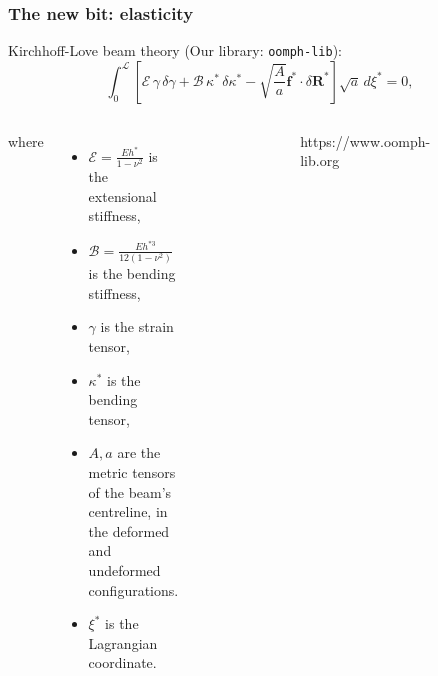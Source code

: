 \documentclass{beamer}
\newcommand{\bi}{\begin{itemize}}
\newcommand{\ei}{\end{itemize}}
\begin{document}
\begin{frame}
	\frametitle{The new bit: elasticity}
	\begin{overlayarea}{\textwidth}{\textheight}
		\vspace{-0.5cm}
       \small Kirchhoff-Love beam theory (Our library: \texttt{oomph-lib}):
		\vspace{-0.1cm} 
		\begin{equation*}
			\int^{\mathcal{L}}_0 \left[\mathscr{E}\,\gamma\, \delta\gamma+\mathscr{B}\,\kappa^*\,\delta\kappa^*-\sqrt{\frac{A}{a}}\bm{f}^*\cdot \delta\bm{R}^*\right]\sqrt{a}\,d\xi^*=0,
		\end{equation*}
		\begin{columns}
	where 
	\bi
	\item $\mathscr{E}=\frac{Eh^*}{1-\nu^2}$ is the extensional stiffness,
	\item $\mathscr{B}=\frac{Eh^{*3}}{12(1-\nu^2)}$ is the bending stiffness,
	\item $\gamma$ is the strain tensor,
	\item $\kappa^*$ is the bending tensor,
	\item $A,a$ are the metric tensors of the beam's centreline, in the deformed and undeformed configurations. 
	\item $\xi^*$ is the Lagrangian coordinate.
	\ei
	\vspace{-0.8cm}
	\begin{figure}[htb]
		\begin{center}
			\includegraphics[width=0.4\textwidth]{plots/logo.png}
		\end{center}
	\end{figure}\vspace{-0.4cm}
\footnotesize \centering https://www.oomph-lib.org \small
	\begin{figure}[htb]
		\begin{center}

\end{center}
\end{figure}
\end{columns}
\end{overlayarea}
\end{frame}
\end{document}

